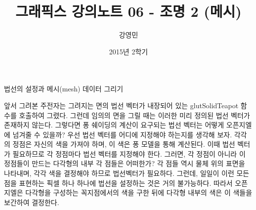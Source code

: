 \documentclass{beamer}
\title[3D 그래픽스 프로그래밍]{그래픽스 강의노트 06 - 조명 2 (메시)}
\author{강영민}
\institute{동명대학교}
\date{2015년 2학기}
\begin{document}
\begin{frame}
  \titlepage
\end{frame}




%


\begin{frame}[fragile]{법선의 설정과 메시(mesh) 데이터 그리기}

앞서 그려본 주전자는 그려지는 면의 법선 벡터가 내장되어 있는 {\sf glutSolidTeapot} 함수를 호출하여 그렸다. 그런데 임의의 면을 그릴 때는 이러한 미리 정의된 법선 벡터가 존재하지 않는다. 그렇다면 퐁 쉐이딩의 계산이 요구되는 법선 벡터는 어떻게 오픈지엘에 넘겨줄 수 있을까?
우선 법선 벡터를 어디에 지정해야 하는지를 생각해 보자. 각각의 정점은 자신의 색을 가져야 하며, 이 색은 퐁 모델을 통해 계산된다. 이때 법선 벡터가 필요하므로 각 정점마다 법선 벡터를 지정해야 한다. 그러면, 각 정점이 아니라 이 정점들이 만드는 다각형의 내부 각 점들은 어떠한가? 각 점들 역시 물체 위의 표면을 나타내며, 각각 색을 결정해야 하므로 법선벡터가 필요하다. 그런데, 일일이 이런 모든 점을 표현하는 픽셀 하나 하나에 법선을 설정하는 것은 거의 불가능하다. 따라서 오픈지엘은 다각형을 구성하는 꼭지점에서의 색을 구한 뒤에 다각형 내부의 색은 이 색들을 보간하여 결정한다.

\end{frame}
\end{document}
